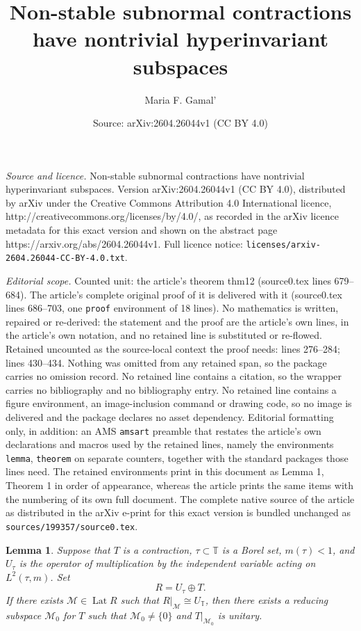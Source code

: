 \documentclass[10pt,a4paper]{amsart}
\title{Non-stable subnormal contractions have nontrivial hyperinvariant subspaces}
\author{Maria F. Gamal'}
\date{Source: arXiv:2604.26044v1 (CC BY 4.0)}
\newtheorem{lemma}{Lemma}
\begin{document}
\maketitle

\noindent\emph{Source and licence.} Non-stable subnormal contractions have nontrivial hyperinvariant subspaces. Version arXiv:2604.26044v1 (CC BY 4.0), distributed by arXiv under the Creative Commons Attribution 4.0 International licence, http://creativecommons.org/licenses/by/4.0/, as recorded in the arXiv licence metadata for this exact version and shown on the abstract page https://arxiv.org/abs/2604.26044v1. Full licence notice: \texttt{licenses/arxiv-2604.26044-CC-BY-4.0.txt}.\par\smallskip

\noindent\textit{Editorial scope.} Counted unit: the article's theorem thm12 (source0.tex lines 679--684). The article's complete original proof of it is delivered with it (source0.tex lines 686--703, one \texttt{proof} environment of 18 lines). No mathematics is written, repaired or re-derived: the statement and the proof are the article's own lines, in the article's own notation, and no retained line is substituted or re-flowed.  Retained uncounted as the source-local context the proof needs: lines 276--284; lines 430--434.  Nothing was omitted from any retained span, so the package carries no omission record.  No retained line contains a citation, so the wrapper carries no bibliography and no bibliography entry.  No retained line contains a figure environment, an image-inclusion command or drawing code, so no image is delivered and the package declares no asset dependency.  Editorial formatting only, in addition: an AMS \texttt{amsart} preamble that restates the article's own declarations and macros used by the retained lines, namely the environments \texttt{lemma}, \texttt{theorem} on separate counters, together with the standard packages those lines need.  The retained environments print in this document as Lemma 1, Theorem 1 in order of appearance, whereas the article prints the same items with the numbering of its own full document.  The complete native source of the article as distributed in the arXiv e-print for this exact version is bundled unchanged as \texttt{sources/199357/source0.tex}.
\begin{lemma}\label{lemtau}  Suppose that $T$ is a contraction,  $\tau\subset\mathbb T$ is a Borel set,  $m(\tau)<1$, 
and $U_\tau$ is the operator of multiplication by the independent variable acting on $L^2(\tau,m)$.   
Set 
\begin{equation*}  R=U_{\tau}\oplus T.
\end{equation*}
If there exists  $\mathcal M\in\operatorname{Lat}R$ such that  $R|_{\mathcal M}\cong U_{\mathbb T}$, then 
there exists a reducing subspace $\mathcal M_0$ for $T$ such that $\mathcal M_0\neq\{0\}$ and
   $T|_{\mathcal M_0}$ is unitary. 
\end{lemma}
\end{document}
